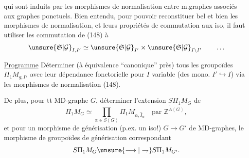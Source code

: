 qui sont induits par les morphismes de normalisation entre m.graphes associés aux graphes ponctuels. Bien entendu, pour pouvoir reconstituer bel et bien les  morphismes de normalisation, et leurs propriétés de commutation aux iso, il faut utiliser les  commutation de (148) à
\[
\unsure{\mathfrak S|\mathcal G}_{I,I'}\simeq\unsure{\mathfrak S|\mathcal G}_{I'}\times\unsure{\mathfrak S|\mathcal G}_{I\setminus I'}\qquad\ldots
\]

\uline{Programme} Déterminer (à équivalence ``canonique'' près) tous les groupoïdes $\Pi_1M_{g,I}$, avec leur dépendance fonctorielle pour  $I$ variable (des mono. $I'\hookrightarrow I$) via les morphismes de normalisation (148).

De plus, pour tt MD-graphe $G$, déterminer l'extension $S\Pi_1M_G$ de
\[
\Pi_1M_G\simeq\prod_{\alpha\in S(G)}\Pi_1M_{\alpha,\widehat I_\alpha}\quad\text{par }\mathbb Z^{\widetilde A(G)},
\]
et pour un morphisme de générisation (p.ex. un iso!)  $G\longrightarrow G'$ de MD-graphes,  le morphisme de groupoïdes de générisation correspondant
\[
S\Pi_1M_G\unsure{\longrightarrow|\rightharpoondown}S\Pi_1M_{G'}.
\]
